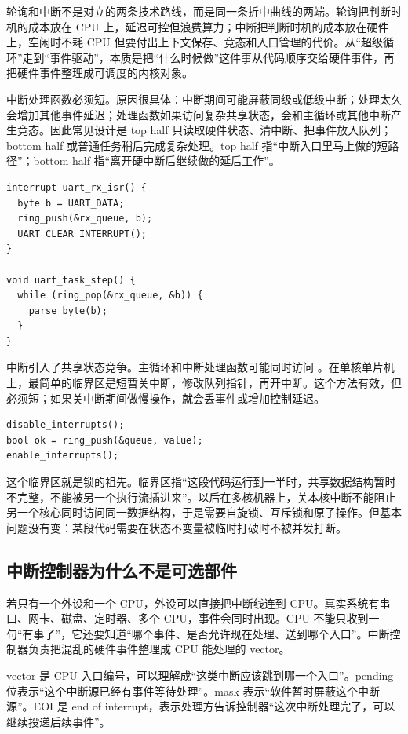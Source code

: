 \begin{keyidea}
轮询和中断不是对立的两条技术路线，而是同一条折中曲线的两端。轮询把判断时机的成本放在 CPU 上，延迟可控但浪费算力；中断把判断时机的成本放在硬件上，空闲时不耗 CPU 但要付出上下文保存、竞态和入口管理的代价。从“超级循环”走到“事件驱动”，本质是把“什么时候做”这件事从代码顺序交给硬件事件，再把硬件事件整理成可调度的内核对象。
\end{keyidea}

中断处理函数必须短。原因很具体：中断期间可能屏蔽同级或低级中断；处理太久会增加其他事件延迟；处理函数如果访问复杂共享状态，会和主循环或其他中断产生竞态。因此常见设计是 top half 只读取硬件状态、清中断、把事件放入队列；bottom half 或普通任务稍后完成复杂处理。top half 指“中断入口里马上做的短路径”；bottom half 指“离开硬中断后继续做的延后工作”。

\begin{lstlisting}
interrupt uart_rx_isr() {
  byte b = UART_DATA;
  ring_push(&rx_queue, b);
  UART_CLEAR_INTERRUPT();
}

void uart_task_step() {
  while (ring_pop(&rx_queue, &b)) {
    parse_byte(b);
  }
}
\end{lstlisting}

中断引入了共享状态竞争。主循环和中断处理函数可能同时访问 。在单核单片机上，最简单的临界区是短暂关中断，修改队列指针，再开中断。这个方法有效，但必须短；如果关中断期间做慢操作，就会丢事件或增加控制延迟。

\begin{lstlisting}
disable_interrupts();
bool ok = ring_push(&queue, value);
enable_interrupts();
\end{lstlisting}

这个临界区就是锁的祖先。临界区指“这段代码运行到一半时，共享数据结构暂时不完整，不能被另一个执行流插进来”。以后在多核机器上，关本核中断不能阻止另一个核心同时访问同一数据结构，于是需要自旋锁、互斥锁和原子操作。但基本问题没有变：某段代码需要在状态不变量被临时打破时不被并发打断。

\subsection{中断控制器为什么不是可选部件}

若只有一个外设和一个 CPU，外设可以直接把中断线连到 CPU。真实系统有串口、网卡、磁盘、定时器、多个 CPU，事件会同时出现。CPU 不能只收到一句“有事了”，它还要知道“哪个事件、是否允许现在处理、送到哪个入口”。中断控制器负责把混乱的硬件事件整理成 CPU 能处理的 vector。

vector 是 CPU 入口编号，可以理解成“这类中断应该跳到哪一个入口”。pending 位表示“这个中断源已经有事件等待处理”。mask 表示“软件暂时屏蔽这个中断源”。EOI 是 end of interrupt，表示处理方告诉控制器“这次中断处理完了，可以继续投递后续事件”。

